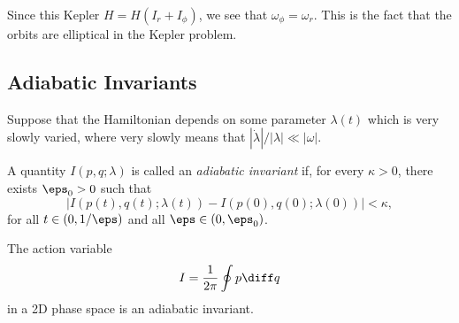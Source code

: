 \documentclass[12pt]{article}
\begin{document}
\begin{exbox}
	Since this Kepler $H = H(I_r + I_\phi)$, we see that $\omega_\phi = \omega_r$. This is the fact that the orbits are elliptical in the Kepler problem.
\end{exbox}

\subsection{Adiabatic Invariants}
\label{sub:ad_inv}

Suppose that the Hamiltonian depends on some parameter $\lambda(t)$ which is very slowly varied, where very slowly means that $|\dot \lambda|/|\lambda| \ll |\omega|$.

A quantity $I(p, q;\lambda)$ is called an \emph{adiabatic invariant} if, for every $\kappa > 0$, there exists $\eps_0 > 0$ such that
\[
|I(p(t), q(t); \lambda(t)) - I(p(0), q(0); \lambda(0))| < \kappa,
\]
for all $t \in (0, 1/\eps)$ and all $\eps \in (0, \eps_0)$.

\begin{proposition}
	The action variable
	\[
	I = \frac{1}{2\pi} \oint p \diff q
	\]
	in a 2D phase space is an adiabatic invariant.
\end{proposition}
\end{document}
